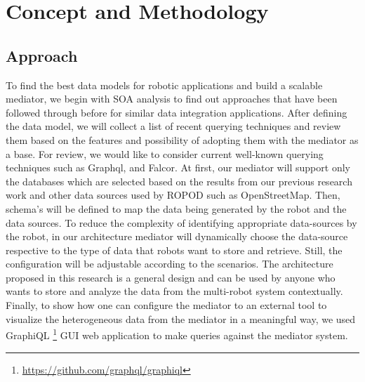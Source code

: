 

	\let\cleardoublepage\clearpage
\chapter{Concept and Methodology}\label{sec:concept_and_methodology}

\section{Approach}\label{sec:approach}
To find the best data models for robotic applications and build a scalable mediator, we begin with SOA analysis to find out approaches that have been followed through before for similar data integration applications. After defining the data model, we will collect a list of recent querying techniques and review them based on the features and possibility of adopting them with the mediator as a base.  For review, we would like to consider current well-known querying techniques such as Graphql, and Falcor. At first, our mediator will support only the databases which are selected based on the results from our previous research work \cite{ravichandranworkbench} and other data sources used by ROPOD such as OpenStreetMap. Then, schema's will be defined to map the data being generated by the robot and the data sources. To reduce the complexity of identifying appropriate data-sources by the robot, in our architecture mediator will dynamically choose the data-source respective to the type of data that robots want to store and retrieve. Still, the configuration will be adjustable according to the scenarios. The architecture proposed in this research is a general design and can be used by anyone who wants to store and analyze the data from the multi-robot system contextually. Finally, to show how one can configure the mediator to an external tool to visualize the heterogeneous data from the mediator in a meaningful way, we used GraphiQL \footnote{\href{https://github.com/graphql/graphiql}{https://github.com/graphql/graphiql}} GUI web application to make queries against the mediator system.


